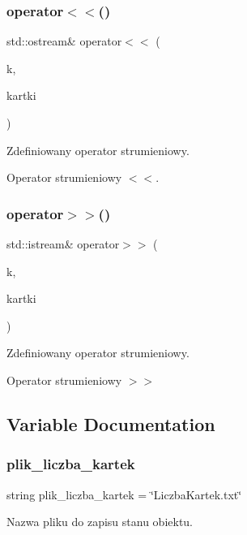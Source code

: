 \subsubsection{operator$<$$<$()}
{\footnotesize\ttfamily std\+::ostream\& operator$<$$<$ (\begin{DoxyParamCaption}\item[{std\+::ostream \&}]{k,  }\item[{\textbf{ Liczba\+Kartek} \&}]{kartki }\end{DoxyParamCaption})}



Zdefiniowany operator strumieniowy. 

Operator strumieniowy $<$$<$. \mbox{\label{_liczba_kartek_8cpp_a0bda24376dd794cf98b245fba9b685ce}} 
\subsubsection{operator$>$$>$()}
{\footnotesize\ttfamily std\+::istream\& operator$>$$>$ (\begin{DoxyParamCaption}\item[{std\+::istream \&}]{k,  }\item[{\textbf{ Liczba\+Kartek} \&}]{kartki }\end{DoxyParamCaption})}



Zdefiniowany operator strumieniowy. 

Operator strumieniowy $>$$>$ 

\subsection{Variable Documentation}
\mbox{\label{_liczba_kartek_8cpp_a00640b3c7deba569a02a8b469b6fa538}} 
\subsubsection{plik\+\_\+liczba\+\_\+kartek}
{\footnotesize\ttfamily string plik\+\_\+liczba\+\_\+kartek = \char`\"{}Liczba\+Kartek.\+txt\char`\"{}}



Nazwa pliku do zapisu stanu obiektu. 

